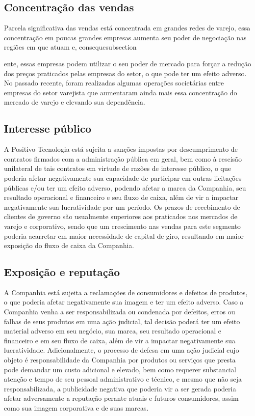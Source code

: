 \subsection{Concentração das vendas} 
Parcela significativa das vendas está concentrada em grandes redes de varejo, essa  concentração em poucas grandes empresas aumenta seu poder de negociação nas regiões em que atuam e, consequesubsection{ente, essas empresas podem utilizar o seu poder de mercado para forçar a redução dos preços praticados pelas empresas do setor, o que pode ter um efeito adverso. No passado recente, foram realizadas algumas operações societárias entre empresas do setor varejista que aumentaram ainda mais essa concentração do mercado de varejo e elevando sua dependência.

\subsection{Interesse público}
A Positivo Tecnologia está sujeita a sanções impostas por descumprimento de contratos firmados com a administração pública em geral, bem como à rescisão unilateral de tais contratos em virtude de razões de interesse público, o que poderia afetar negativamente sua capacidade de participar em outras licitações públicas e/ou ter um efeito adverso, podendo afetar a marca da Companhia, seu resultado operacional e financeiro e seu fluxo de caixa, além de vir a impactar negativamente sua lucratividade por um período. Os prazos de recebimento de clientes de governo são usualmente superiores aos praticados nos mercados de varejo e corporativo, sendo que um crescimento nas vendas para este segmento poderia acarretar em maior necessidade de capital de giro, resultando em maior exposição do fluxo de caixa da Companhia.

\subsection{Exposição e reputação}
A Companhia está sujeita a reclamações de consumidores e defeitos de produtos, o que poderia afetar negativamente sua imagem e ter um efeito adverso. Caso a Companhia venha a ser responsabilizada ou condenada por defeitos, erros ou falhas de seus produtos em uma ação judicial, tal decisão poderá ter um efeito material adverso em seu negócio, sua marca, seu resultado operacional e financeiro e em seu fluxo de caixa, além de vir a impactar negativamente sua lucratividade.
Adicionalmente, o processo de defesa em uma ação judicial cujo objeto é responsabilidade da Companhia por produtos ou serviços que presta pode demandar um custo adicional e elevado, bem como requerer substancial atenção e tempo de seu pessoal administrativo e técnico, e mesmo que não seja responsabilizada, a publicidade negativa que poderia vir a ser gerada poderia afetar adversamente a reputação perante atuais e futuros consumidores, assim como sua imagem corporativa e de suas marcas.

}
